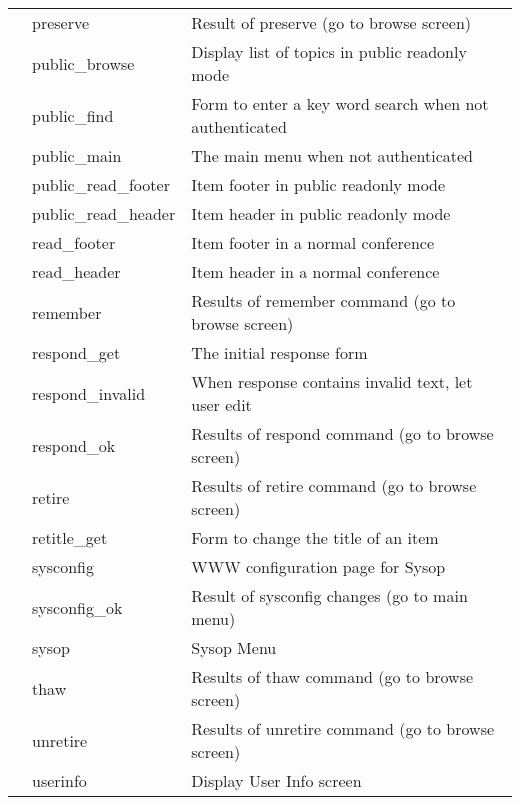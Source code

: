 \documentclass[twoside]{report}
\begin{document}
\begin{supertabular}{lll}
         & preserve 
           & Result of preserve (go to browse screen) \\
         & public\_browse
           & Display list of topics in public readonly mode \\
         & public\_find 
           & Form to enter a key word search when not authenticated \\
         & public\_main
           & The main menu when not authenticated \\
         & public\_read\_footer
           & Item footer in public readonly mode \\
         & public\_read\_header 
           & Item header in public readonly mode \\
         & read\_footer        
           & Item footer in a normal conference \\
         & read\_header        
           & Item header in a normal conference \\
         & remember
           & Results of remember command (go to browse screen) \\
         & respond\_get
           & The initial response form \\
         & respond\_invalid
           & When response contains invalid text, let user edit \\
         & respond\_ok
           & Results of respond command (go to browse screen) \\
         & retire
           & Results of retire command (go to browse screen) \\
         & retitle\_get
           & Form to change the title of an item \\
         & sysconfig
           & WWW configuration page for Sysop \\
         & sysconfig\_ok
           & Result of sysconfig changes (go to main menu) \\
         & sysop
           &  Sysop Menu \\
         & thaw
           & Results of thaw command (go to browse screen) \\
         & unretire           
           & Results of unretire command (go to browse screen) \\
         & userinfo
           & Display User Info screen \\
      \end{supertabular}
\end{document}
